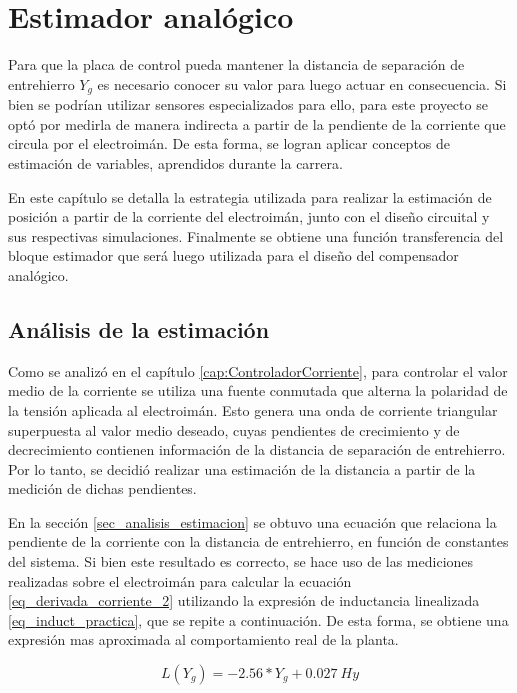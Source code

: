 \chapter{Estimador analógico}  \label{cap:Estimador Analogico}

Para que la placa de control pueda mantener la distancia de separación de entrehierro $Y_{g}$ es necesario conocer su valor para luego actuar en consecuencia. Si bien se podrían utilizar sensores  especializados para ello, para este proyecto se optó por medirla de manera indirecta a partir de la pendiente de la corriente que circula por el electroimán. De esta forma, se logran aplicar conceptos de estimación de variables, aprendidos durante la carrera. 

En este capítulo se detalla la estrategia utilizada para realizar la estimación de posición a partir de la corriente del electroimán, junto con el diseño circuital y sus respectivas simulaciones. Finalmente se obtiene una función transferencia del bloque estimador que será luego utilizada para el diseño del compensador analógico.

\section{Análisis de la estimación}

Como se analizó en el capítulo \ref{cap:ControladorCorriente}, para controlar el valor medio de la corriente se utiliza una fuente conmutada que alterna la polaridad de la tensión aplicada al electroimán. Esto genera una onda de corriente triangular superpuesta al valor medio deseado, cuyas pendientes de crecimiento y de decrecimiento contienen información de la distancia de separación de entrehierro. Por lo tanto, se decidió realizar una estimación de la distancia a partir de la medición de dichas pendientes.

En la sección \ref{sec_analisis_estimacion} se obtuvo una ecuación que relaciona la pendiente de la corriente con la distancia de entrehierro, en función de constantes del sistema. Si bien este resultado es correcto, se hace uso de las mediciones realizadas sobre el electroimán para calcular la ecuación \ref{eq_derivada_corriente_2} utilizando la expresión de inductancia linealizada \ref{eq_induct_practica}, que se repite a continuación. De esta forma, se obtiene una expresión mas aproximada al comportamiento real de la planta.

\begin{equation*}
	L(Y_g)=-2.56*Y_{g}+0.027\:Hy
\end{equation*}

